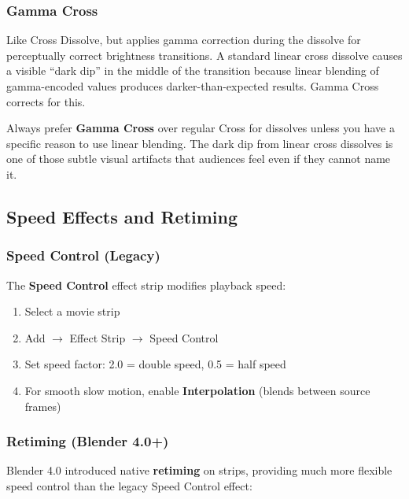 \subsubsection{Gamma Cross}

Like Cross Dissolve, but applies gamma correction during the dissolve for perceptually correct brightness transitions. A standard linear cross dissolve causes a visible ``dark dip'' in the middle of the transition because linear blending of gamma-encoded values produces darker-than-expected results. Gamma Cross corrects for this.

\begin{tipbox}
Always prefer \textbf{Gamma Cross} over regular Cross for dissolves unless you have a specific reason to use linear blending. The dark dip from linear cross dissolves is one of those subtle visual artifacts that audiences feel even if they cannot name it.
\end{tipbox}

\subsection{Speed Effects and Retiming}

\subsubsection{Speed Control (Legacy)}

The \textbf{Speed Control} effect strip modifies playback speed:

\begin{enumerate}[leftmargin=2em]
  \item Select a movie strip
  \item Add $\rightarrow$ Effect Strip $\rightarrow$ Speed Control
  \item Set speed factor: 2.0 = double speed, 0.5 = half speed
  \item For smooth slow motion, enable \textbf{Interpolation} (blends between source frames)
\end{enumerate}

\subsubsection{Retiming (Blender 4.0+)}

Blender 4.0 introduced native \textbf{retiming} on strips, providing much more flexible speed control than the legacy Speed Control effect:

